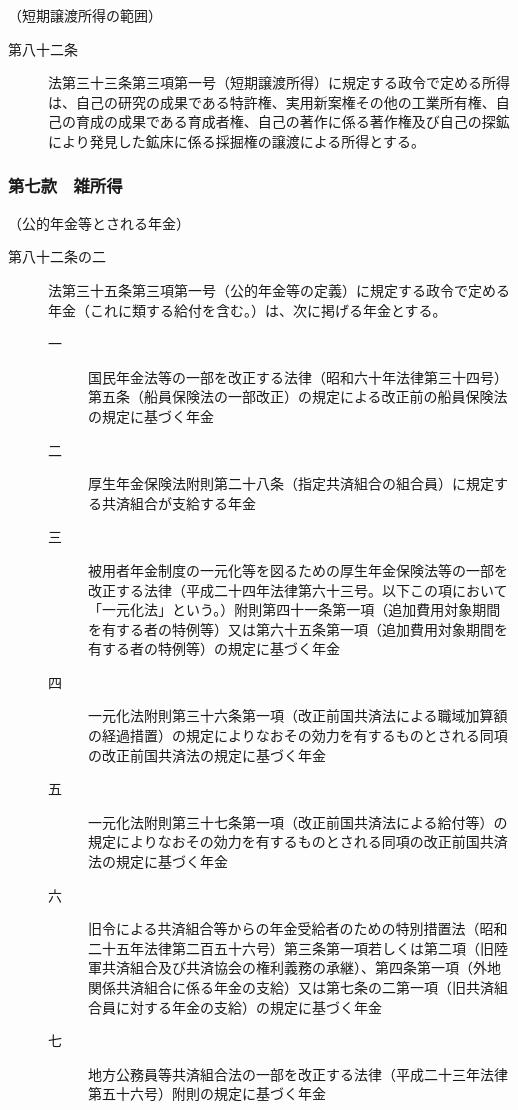 \documentclass[twocolumn,a4j,10pt]{ltjtarticle}
\begin{document}
\noindent\hspace{10pt}（短期譲渡所得の範囲）
\begin{description}
\item[第八十二条]法第三十三条第三項第一号（短期譲渡所得）に規定する政令で定める所得は、自己の研究の成果である特許権、実用新案権その他の工業所有権、自己の育成の成果である育成者権、自己の著作に係る著作権及び自己の探鉱により発見した鉱床に係る採掘権の譲渡による所得とする。
\end{description}
\subsubsection*{第七款　雑所得}
\noindent\hspace{10pt}（公的年金等とされる年金）
\begin{description}
\item[第八十二条の二]法第三十五条第三項第一号（公的年金等の定義）に規定する政令で定める年金（これに類する給付を含む。）は、次に掲げる年金とする。
\begin{description}
\item[一]国民年金法等の一部を改正する法律（昭和六十年法律第三十四号）第五条（船員保険法の一部改正）の規定による改正前の船員保険法の規定に基づく年金
\item[二]厚生年金保険法附則第二十八条（指定共済組合の組合員）に規定する共済組合が支給する年金
\item[三]被用者年金制度の一元化等を図るための厚生年金保険法等の一部を改正する法律（平成二十四年法律第六十三号。以下この項において「一元化法」という。）附則第四十一条第一項（追加費用対象期間を有する者の特例等）又は第六十五条第一項（追加費用対象期間を有する者の特例等）の規定に基づく年金
\item[四]一元化法附則第三十六条第一項（改正前国共済法による職域加算額の経過措置）の規定によりなおその効力を有するものとされる同項の改正前国共済法の規定に基づく年金
\item[五]一元化法附則第三十七条第一項（改正前国共済法による給付等）の規定によりなおその効力を有するものとされる同項の改正前国共済法の規定に基づく年金
\item[六]旧令による共済組合等からの年金受給者のための特別措置法（昭和二十五年法律第二百五十六号）第三条第一項若しくは第二項（旧陸軍共済組合及び共済協会の権利義務の承継）、第四条第一項（外地関係共済組合に係る年金の支給）又は第七条の二第一項（旧共済組合員に対する年金の支給）の規定に基づく年金
\item[七]地方公務員等共済組合法の一部を改正する法律（平成二十三年法律第五十六号）附則の規定に基づく年金

\end{description}
\end{description}
\end{document}
